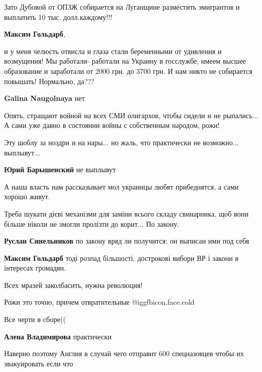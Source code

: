\begin{itemize}

Зато Дубовой от ОПЗЖ собирается на Луганщине разместить эмигрантов и выплатить
10 тыс. долл.каждому!!!

\textbf{Максим Гольдарб}, 

и у меня челюсть отвисла и глаза стали беременными от удивления и возмущения!
Мы работали- работали на Украину в госслужбе, имеем высшее образование и
заработали от 2000 грн. до 3700 грн. И нам никто не собирается повышать!
Нормально, да???

\textbf{Galina Naugolnaya} нет


Опять, стращают войной на всех СМИ олигархов, чтобы сидели и не рыпались... А
сами уже давно в состоянии войны с собственным народом, рожи!


Эту шоблу за ноздри и на нары... но жаль, что практически не возможно...
выплывут...

\textbf{Юрий Барышенский} не выплывут


А наша власть нам рассказывает мол украинцы любят прибеднятся, а сами хорошо
живут.


Треба шукати дієві механізми для заміни всього складу свинарника, щоб вони
більше ніколи не змогли пролізти до корит... По закону.

\begin{itemize} %
\textbf{Руслан Синельников} по закону вряд ли получится: он выписан ими под себя

\textbf{Максим Гольдарб} тоді розпад більшості, дострокові вибори ВР і закони в інтересах громадян.
\end{itemize} %

Всех мразей заколбасить, нужна революция!

Рожи это точно, причем отвратительные @igg{fbicon.face.cold} 

Все черти в сборе((

\textbf{Алена Владимирова} практически

Наверно поэтому Англия в случай чего отправит 600 спецназовцев чтобы их эвакуировать если что

\end{itemize} %
